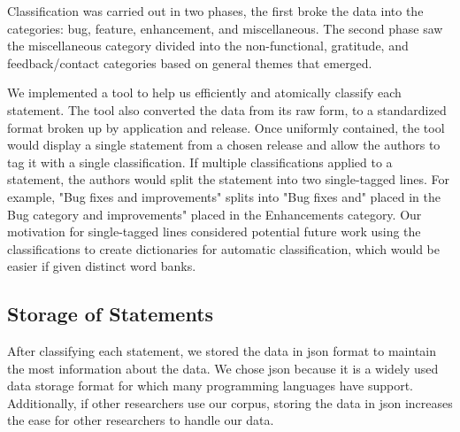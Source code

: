 \documentclass{acm_proc_article-sp}
\begin{document}
Classification was carried out in two phases, the first broke the data into the categories: bug, feature, enhancement, and miscellaneous.
The second phase saw the miscellaneous category divided into the non-functional, gratitude, and feedback/contact categories based on general themes that emerged.

We implemented a tool to help us efficiently and atomically classify each statement.
The tool also converted the data from its raw form, to a standardized format broken up by application and release.
Once uniformly contained, the tool would display a single statement from a chosen release and allow the authors to tag it with a single classification. 
If multiple classifications applied to a statement, the authors would split the statement into two single-tagged lines.
For example, "Bug fixes and improvements" splits into "Bug fixes and" placed in the Bug category and improvements" placed in the Enhancements category.
Our motivation for single-tagged lines considered potential future work using the classifications to create dictionaries for automatic classification, which would be easier if given distinct word banks.



\subsection{Storage of Statements}
After classifying each statement, we stored the data in json format to maintain the most information about the data.
We chose json because it is a widely used data storage format for which many programming languages have support. 
Additionally, if other researchers use our corpus, storing the data in json increases the ease for other researchers to handle our data.
\end{document}
